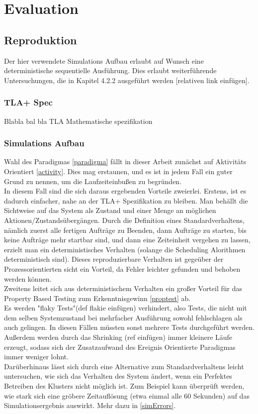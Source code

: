 \chapter{Evaluation}

\section{Reproduktion}

Der hier verwendete Simulations Aufbau erlaubt auf Wunsch eine deterministische sequentielle Ausführung. Dies erlaubt weiterführende Untersuchungen, die in Kapitel 4.2.2 ausgeführt werden [relativen link einfügen].

\subsection{TLA+ Spec}
Blabla bal
bla
TLA
Mathematische spezifikation

\subsection{Simulations Aufbau}
Wahl des Paradigmas \ref{paradigma} fällt in dieser Arbeit zunächst auf Aktivitäts Orientiert \ref{activity}. Dies mag erstaunen, und es ist in jedem Fall ein guter Grund zu nennen, um die Laufzeiteinbußen zu begründen.\\
In diesem Fall sind die sich daraus ergebenden Vorteile zweierlei. Erstens, ist es dadurch einfacher, nahe an der TLA+ Spezifikation zu bleiben. Man behällt die Sichtweise auf das System als Zustand und einer Menge an möglichen Aktionen/Zustandsübergängen. Durch die Definition eines Standardverhaltens, nämlich zuerst alle fertigen Aufträge zu Beenden, dann Aufträge zu starten, bis keine Aufträge mehr startbar sind, und dann eine Zeiteinheit vergehen zu lassen, erzielt man ein deterministisches Verhalten (solange die Scheduling Alorithmen deterministisch sind). Dieses reproduzierbare Verhalten ist gegeüber der Prozessorientierten sicht ein Vorteil, da Fehler leichter gefunden und behoben werden können.\\
Zweitens leitet sich aus deterministischem Verhalten ein großer Vorteil für das Property Based Testing zum Erkenntnisgewinn \ref{proptest} ab.\\
Es werden "flaky Tests"(def flakie einfügen) verhindert, also Tests, die nicht mit dem selben Systemzustand bei mehrfacher Ausführung sowohl fehlschlagen als auch gelingen. In diesen Fällen müssten sonst mehrere Tests durchgeführt werden. Außerdem werden durch das Shrinking (ref einfügen) immer kleinere Läufe erzeugt, sodass sich der Zusatzaufwand des Ereignis Orientierte Paradigmas immer weniger lohnt.\\
Darüberhinaus lässt sich durch eine Alternative zum Standardverhaltens leicht untersuchen, wie sich das Verhalten des System ändert, wenn ein Perfektes Betreiben des Klusters nicht möglich ist. Zum Beispiel kann überprüft werden, wie stark sich eine gröbere Zeitauflösung (etwa einmal alle 60 Sekunden) auf das Simulationsergebnis auswirkt. Mehr dazu in \ref{simErrors}.


